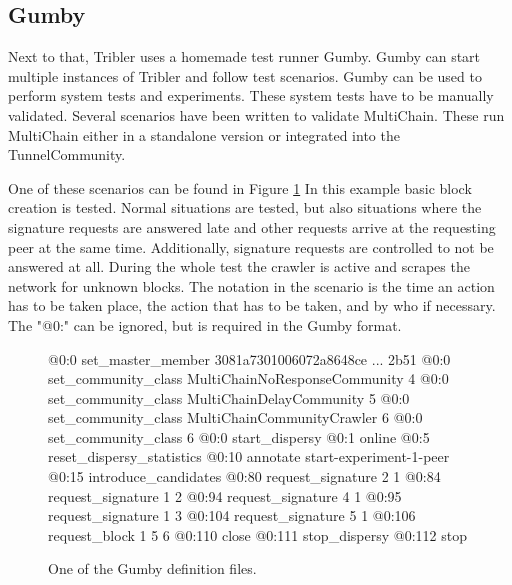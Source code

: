 \subsection{Gumby}

Next to that, Tribler uses a homemade test runner Gumby.
Gumby can start multiple instances of Tribler and follow test scenarios.
Gumby can be used to perform system tests and experiments.
These system tests have to be manually validated.
Several scenarios have been written to validate MultiChain.
These run MultiChain either in a standalone version or integrated into the TunnelCommunity.

One of these scenarios can be found in Figure \ref{fig:exp-gumby-scenario}
In this example basic block creation is tested.
Normal situations are tested,
but also situations where the signature requests are answered late
and other requests arrive at the requesting peer at the same time.
Additionally, signature requests are controlled to not be answered at all.
During the whole test the crawler is active and scrapes the network for unknown blocks.
The notation in the scenario is the time an action has to be taken place,
the action that has to be taken, and by who if necessary.
The "@0:" can be ignored, but is required in the Gumby format.

\begin{figure}
\begin{FVerbatim}[fontsize=\small]
@0:0 set_master_member 3081a7301006072a8648ce ... 2b51
@0:0 set_community_class MultiChainNoResponseCommunity {4}
@0:0 set_community_class MultiChainDelayCommunity {5}
@0:0 set_community_class MultiChainCommunityCrawler {6}
@0:0 set_community_class {6}
@0:0 start_dispersy
@0:1 online
@0:5 reset_dispersy_statistics
@0:10 annotate start-experiment-1-peer
@0:15 introduce_candidates
@0:80 request_signature 2 {1}
@0:84 request_signature 1 {2}
@0:94 request_signature 4 {1}
@0:95 request_signature 1 {3}
@0:104 request_signature 5 {1}
@0:106 request_block 1 5 {6}
@0:110 close
@0:111 stop_dispersy
@0:112 stop
\end{FVerbatim}
    \caption{One of the Gumby definition files.}
    \label{fig:exp-gumby-scenario}
\end{figure}